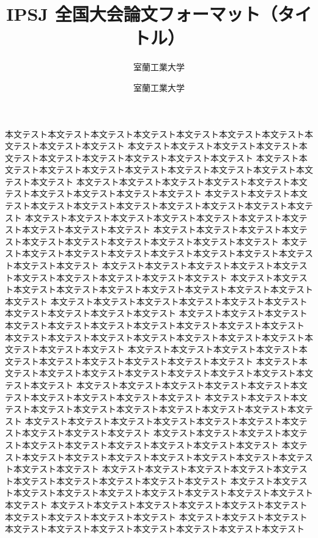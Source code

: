 \documentclass[uplatex,dvipdfmx,a4paper,twocolumn,base=11pt,jbase=11pt,js=standard]{bxjsarticle}
\title{IPSJ 全国大会論文フォーマット（タイトル）}{「タイトル」英文による記述}
\author{室蘭工業大学}{室蘭 太郎}{Taro Muroran, Muroran Institute of Technology}
\author{室蘭工業大学}{工業 太郎}{Taro Kogyo, Muroran Institute of Technology}
\begin{document}
\maketitle

本文テスト本文テスト本文テスト本文テスト本文テスト本文テスト本文テスト本文テスト本文テスト本文テスト
本文テスト本文テスト本文テスト本文テスト本文テスト本文テスト本文テスト本文テスト本文テスト本文テスト
本文テスト本文テスト本文テスト本文テスト本文テスト本文テスト本文テスト本文テスト本文テスト本文テスト
本文テスト本文テスト本文テスト本文テスト本文テスト本文テスト本文テスト本文テスト本文テスト本文テスト
本文テスト本文テスト本文テスト本文テスト本文テスト本文テスト本文テスト本文テスト本文テスト本文テスト
本文テスト本文テスト本文テスト本文テスト本文テスト本文テスト本文テスト本文テスト本文テスト本文テスト
本文テスト本文テスト本文テスト本文テスト本文テスト本文テスト本文テスト本文テスト本文テスト本文テスト
本文テスト本文テスト本文テスト本文テスト本文テスト本文テスト本文テスト本文テスト本文テスト本文テスト
本文テスト本文テスト本文テスト本文テスト本文テスト本文テスト本文テスト本文テスト本文テスト本文テスト
本文テスト本文テスト本文テスト本文テスト本文テスト本文テスト本文テスト本文テスト本文テスト本文テスト
本文テスト本文テスト本文テスト本文テスト本文テスト本文テスト本文テスト本文テスト本文テスト本文テスト
本文テスト本文テスト本文テスト本文テスト本文テスト本文テスト本文テスト本文テスト本文テスト本文テスト
本文テスト本文テスト本文テスト本文テスト本文テスト本文テスト本文テスト本文テスト本文テスト本文テスト
本文テスト本文テスト本文テスト本文テスト本文テスト本文テスト本文テスト本文テスト本文テスト本文テスト
本文テスト本文テスト本文テスト本文テスト本文テスト本文テスト本文テスト本文テスト本文テスト本文テスト
本文テスト本文テスト本文テスト本文テスト本文テスト本文テスト本文テスト本文テスト本文テスト本文テスト
本文テスト本文テスト本文テスト本文テスト本文テスト本文テスト本文テスト本文テスト本文テスト本文テスト
本文テスト本文テスト本文テスト本文テスト本文テスト本文テスト本文テスト本文テスト本文テスト本文テスト
本文テスト本文テスト本文テスト本文テスト本文テスト本文テスト本文テスト本文テスト本文テスト本文テスト
本文テスト本文テスト本文テスト本文テスト本文テスト本文テスト本文テスト本文テスト本文テスト本文テスト
本文テスト本文テスト本文テスト本文テスト本文テスト本文テスト本文テスト本文テスト本文テスト本文テスト
本文テスト本文テスト本文テスト本文テスト本文テスト本文テスト本文テスト本文テスト本文テスト本文テスト
本文テスト本文テスト本文テスト本文テスト本文テスト本文テスト本文テスト本文テスト本文テスト本文テスト
本文テスト本文テスト本文テスト本文テスト本文テスト本文テスト本文テスト本文テスト本文テスト本文テスト
\end{document}
